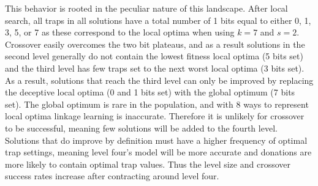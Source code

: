 This behavior is rooted in the peculiar nature
of this landscape.
After local search, all traps in all solutions have a total
number of 1 bits equal to either 0, 1, 3, 5, or 7 as these correspond to the local
optima when using $k=7$ and $s=2$. Crossover easily overcomes the
two bit plateaus, and as a result solutions in the second level generally do not
contain the lowest fitness local optima (5 bits set) and the third
level has few traps set to the next worst local optima (3 bits set). As a result,
solutions that reach the third level can only be improved by replacing the deceptive
local optima (0 and 1 bits set) with the global optimum (7 bits set).
The global optimum is rare in the population, and with 8 ways to represent local optima
linkage learning is inaccurate. Therefore it is unlikely for crossover to be successful,
meaning few solutions will be added to the fourth level. Solutions that do improve by
definition must have a higher frequency of optimal trap settings, meaning level four's model
will be more accurate and donations are more likely to contain optimal trap values.
Thus the level size and crossover success rates increase after contracting around level four.
